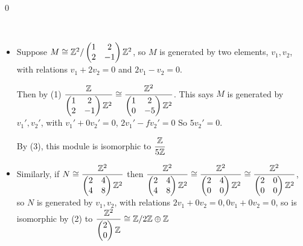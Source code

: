 \documentclass[x11names,reqno,14pt]{extarticle}
\newcommand{\pmat}[4]{\begin{pmatrix} #1 & #2 \\ #3 & #4 \end{pmatrix}}
\begin{document}
\qed

\exm\,

\begin{itemize}

\item Suppose $M \cong \mathbb{Z}^2/\begin{pmatrix} 1 & 2 \\ 2 & - 1\\ \end{pmatrix}\mathbb{Z}^2$, so $M$ is generated by two elements, $v_1, v_2$, with relations $v_1 + 2v_2 = 0$ and $2v_1 - v_2 = 0$.

Then by (1) $\dfrac{\mathbb{Z}}{\begin{pmatrix} 1 & 2 \\ 2 & - 1\end{pmatrix}\mathbb{Z}^2} \cong \dfrac{\mathbb{Z}^2}{\begin{pmatrix} 1 & 2 \\ 0 & - 5\end{pmatrix}\mathbb{Z}^2}$. This says $M$ is generated by $v_1', v_2'$, with $v_1' + 0v_2' = 0$, $2v_1' - fv_2' = 0$ So $5v_2' = 0$. 

By (3), this module is isomorphic to $\dfrac{\mathbb{Z}}{5\mathbb{Z}}$

\item Similarly, if $N \cong \dfrac{\Z^2}{\pmat{2}{4}{4}{8}\Z^2}$ then $\dfrac{\Z^2}{\pmat{2}{4}{4}{8}\Z^2} \cong \dfrac{\Z^2}{\pmat{2}{4}{0}{0}\Z^2} \cong \dfrac{\Z^2}{\pmat{2}{0}{0}{0}\Z^2}$, so $N$ is generated by $v_1, v_2$, with relations $2v_1 + 0v_2 = 0, 0v_1 + 0v_2 = 0$, so is isomorphic by (2) to $\dfrac{\mathbb{Z}^2}{\begin{pmatrix} 2 \\ 0 \end{pmatrix}\mathbb{Z}} \cong \mathbb{Z}/2\mathbb{Z}\oplus\mathbb{Z}$

\end{itemize}
\end{document}

